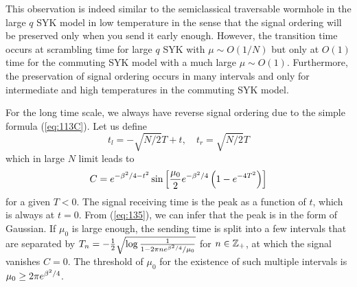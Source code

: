 \documentclass[11pt]{article}
\renewcommand{\>}{\rangle}
\newcommand{\<}{\langle}
\begin{document}
This observation is indeed similar to the semiclassical traversable
wormhole in the large $q$ SYK model in low temperature in the sense that
the signal ordering will be preserved only when you send it early
enough. However, the transition time occurs at scrambling time for
large $q$ SYK with $\mu\sim O(1/N)$ but only at $O(1)$ time for
the commuting SYK model with a much large $\mu\sim O(1)$. Furthermore,
the preservation of signal ordering occurs in many intervals and only
for intermediate and high temperatures in the commuting SYK model.

For the long time scale, we always have reverse signal ordering due
to the simple formula (\ref{eq:113C}). Let us define
\begin{equation}
t_{l}=-\sqrt{N/2}T+t,\quad t_{r}=\sqrt{N/2}T
\end{equation}
which in large $N$ limit leads to
\begin{equation}
C=e^{-\beta^{2}/4-t^{2}}\sin\left[\frac{\mu_{0}}{2}e^{-\beta^{2}/4}\left(1-e^{-4T^{2}}\right)\right]\label{eq:135}
\end{equation}
for a given $T<0$. The signal receiving time is the peak as a function
of $t$, which is always at $t=0$. From (\ref{eq:135}), we can infer
that the peak is in the form of Gaussian. If $\mu_{0}$ is large enough,
the sending time is split into a few intervals that are separated
by $T_{n}=-\frac{1}{2}\sqrt{\log\frac{1}{1-2\pi ne^{\beta^{2}/4}/\mu_{0}}}$ for
$n\in\mathbb{Z}_{+}$, at which the signal vanishes $C=0$. The threshold
of $\mu_{0}$ for the existence of such multiple intervals is $\mu_{0}\geq2\pi e^{\beta^{2}/4}$.
\end{document}
